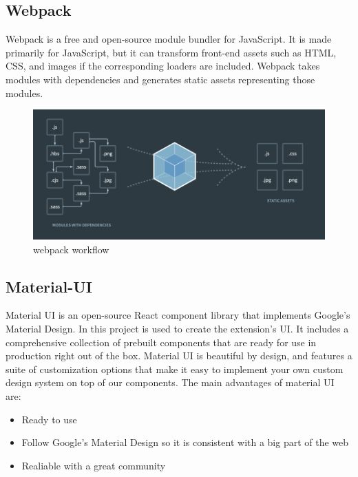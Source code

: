 \subsection {Webpack}

Webpack is a free and open-source module bundler for JavaScript. It is made primarily for JavaScript, but it can transform front-end assets such as HTML, CSS, and images if the corresponding loaders are included. Webpack takes modules with dependencies and generates static assets representing those modules.

\begin{figure}[h!]
    \vspace{0.5cm}
    \includegraphics[width=\textwidth]{images/extension/webpack-bundle.png}
    \caption{webpack workflow}
    \label{fig:webpack-bundle} %
\end{figure}

\subsection {Material-UI}

Material UI is an open-source React component library that implements Google's Material Design. In this project is used to create the extension's UI.
It includes a comprehensive collection of prebuilt components that are ready for use in production right out of the box.
Material UI is beautiful by design, and features a suite of customization options that make it easy to implement your own custom design system on top of our components.
The main advantages of material UI are:

\begin{itemize}
    \item Ready to use
    \item Follow Google's Material Design so it is consistent with a big part of the web
    \item Realiable with a great community
\end{itemize}


